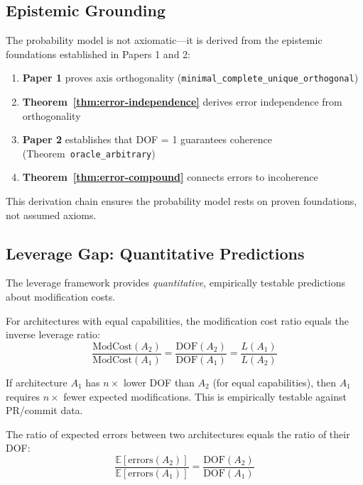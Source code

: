 \subsection{Epistemic Grounding}

The probability model is not axiomatic---it is derived from the epistemic foundations established in Papers 1 and 2:

\begin{enumerate}
\item \textbf{Paper 1} proves axis orthogonality (\texttt{minimal\_complete\_unique\_orthogonal})
\item \textbf{Theorem~\ref{thm:error-independence}} derives error independence from orthogonality
\item \textbf{Paper 2} establishes that DOF = 1 guarantees coherence (Theorem~\texttt{oracle\_arbitrary})
\item \textbf{Theorem~\ref{thm:error-compound}} connects errors to incoherence
\end{enumerate}

This derivation chain ensures the probability model rests on proven foundations, not assumed axioms.

\subsection{Leverage Gap: Quantitative Predictions}

The leverage framework provides \emph{quantitative}, empirically testable predictions about modification costs.

\begin{theorem}\label{thm:leverage-gap}
For architectures with equal capabilities, the modification cost ratio equals the inverse leverage ratio:
\[
\frac{\text{ModCost}(A_2)}{\text{ModCost}(A_1)} = \frac{\text{DOF}(A_2)}{\text{DOF}(A_1)} = \frac{L(A_1)}{L(A_2)}
\]
\end{theorem}

\begin{theorem}\label{thm:testable-prediction}
If architecture $A_1$ has $n\times$ lower DOF than $A_2$ (for equal capabilities), then $A_1$ requires $n\times$ fewer expected modifications. This is empirically testable against PR/commit data.
\end{theorem}

\begin{corollary}\label{cor:dof-ratio}
The ratio of expected errors between two architectures equals the ratio of their DOF:
\[
\frac{\mathbb{E}[\text{errors}(A_2)]}{\mathbb{E}[\text{errors}(A_1)]} = \frac{\text{DOF}(A_2)}{\text{DOF}(A_1)}
\]
\end{corollary}

